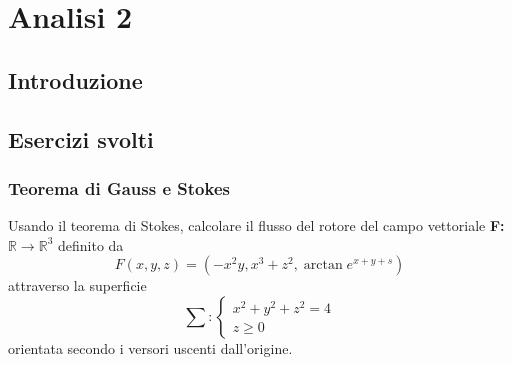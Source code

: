 \part{Analisi 2}
\chapter{Introduzione}
\chapter{Esercizi svolti}
\section{Teorema di Gauss e Stokes}
\begin{esercizio}
  Usando il teorema di Stokes, calcolare il flusso del rotore del campo vettoriale \textbf{F:}$\mathds{R}\to \mathds{R}^3$ definito da
  \begin{equation*}
	F(x,y,z)=\left(-x^2y, x^3+z^2,\arctan e^{x+y+s}\right)
  \end{equation*}
  attraverso la superficie
  \begin{equation*}
    \sum:\begin{cases}
           x^2+y^2+z^2=4\\
           z\geq 0
         \end{cases}
  \end{equation*}
  orientata secondo i versori uscenti dall'origine.
\end{esercizio}
